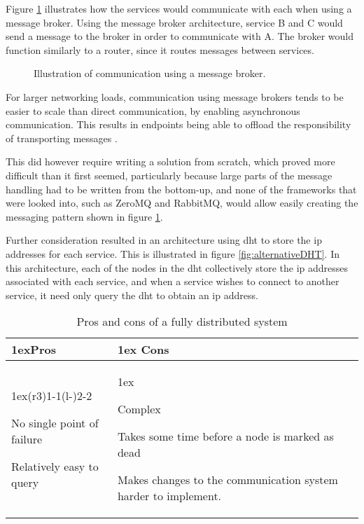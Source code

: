 Figure \ref{fig:alternativeMessageBroker} illustrates how the services would communicate with each when using a message broker. Using the message broker architecture, service B and C would send a message to the broker in order to communicate with A. The broker would function similarly to a router, since it routes messages between services.

\begin{figure}[H]
    \centering
    \scalebox{1.0}{}
    \caption{Illustration of communication using a message broker.}
    \label{fig:alternativeMessageBroker}
\end{figure}

For larger networking loads, communication using message brokers tends to be easier to scale than direct communication, by enabling asynchronous communication. This results in endpoints being able to offload the responsibility of transporting messages \citep{nginxMicroservicesMessageBroker}.

This did however require writing a solution from scratch, which proved more difficult than it first seemed, particularly because large parts of the message handling had to be written from the bottom-up, 
and none of the frameworks that were looked into, such as ZeroMQ and RabbitMQ, would allow easily creating the messaging pattern shown in figure \ref{fig:alternativeMessageBroker}.

Further consideration resulted in an architecture using \acrshort{dht} to store the \acrshort{ip} addresses for each service. This is illustrated in figure \ref{fig:alternativeDHT}. In this architecture, each of the nodes in the \acrshort{dht} collectively store the \acrshort{ip} addresses associated with each service, and when a service wishes to connect to another service, it need only query the \acrshort{dht} to obtain an \acrshort{ip} address.

\begin{table}[H]
\caption{Pros and cons of a fully distributed system} 
\begin{tabularx}{\linewidth}{>{\parskip1ex}X@{\kern4\tabcolsep}>{\parskip1ex}X}
\toprule
\hfil\bfseries Pros & \hfil\bfseries Cons\\
\cmidrule(r{3\tabcolsep}){1-1}\cmidrule(l{-\tabcolsep}){2-2}

No single point of failure\par
Relatively easy to query\par

&

Complex\par 
Takes some time before a node is marked as dead\par
Makes changes to the communication system harder to implement.
\\\end{tabularx}
\label{table:pros_cons_distr}
\end{table}

